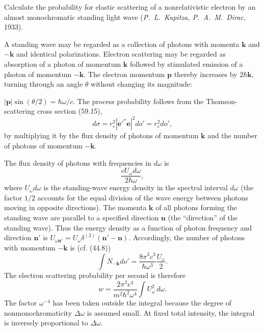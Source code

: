 \ProblemHeading

Calculate the probability for elastic scattering of a nonrelativistic electron by an almost monochromatic standing light wave (\emph{P.~L.~Kapitza, P.~A.~M.~Dirac}, 1933).

\SolutionHeading A standing wave may be regarded as a collection of photons with momenta $\mathbf k$ and $-\mathbf k$ and identical polarizations. Electron scattering may be regarded as absorption of a photon of momentum $\mathbf k$ followed by stimulated emission of a photon of momentum $-\mathbf k$. The electron momentum $\mathbf p$ thereby increases by $2\hbar\mathbf k$, turning through an angle $\theta$ without changing its magnitude:

$|\mathbf p|\sin(\theta/2)=\hbar\omega/c$. The process probability follows from the Thomson-scattering cross section (59.15),
\[
d\sigma=r_e^2|\mathbf e'^*\mathbf e|^2do'=r_e^2do',
\]
by multiplying it by the flux density of photons of momentum $\mathbf k$ and the number of photons of momentum $-\mathbf k$.

The flux density of photons with frequencies in $d\omega$ is
\[
\frac{cU_\omega d\omega}{2\hbar\omega},
\]
where $U_\omega d\omega$ is the standing-wave energy density in the spectral interval $d\omega$ (the factor $1/2$ accounts for the equal division of the wave energy between photons moving in opposite directions). The momenta $\mathbf k$ of all photons forming the standing wave are parallel to a specified direction $\mathbf n$ (the ``direction'' of the standing wave). Thus the energy density as a function of photon frequency and direction $\mathbf n'$ is $U_{\omega\mathbf n'}=U_\omega\delta^{(2)}(\mathbf n'-\mathbf n)$. Accordingly, the number of photons with momentum $-\mathbf k$ is (cf. (44.8))
\[
\int N_{-\mathbf k}do'=\frac{8\pi^3c^3}{\hbar\omega^3}\frac{U_\omega}{2}.
\]
The electron scattering probability per second is therefore
\[
w=\frac{2\pi^3e^4}{m^2\hbar^2\omega^4}\int U_\omega^2\,d\omega.
\]
The factor $\omega^{-4}$ has been taken outside the integral because the degree of nonmonochromaticity $\Delta\omega$ is assumed small. At fixed total intensity, the integral is inversely proportional to $\Delta\omega$.
